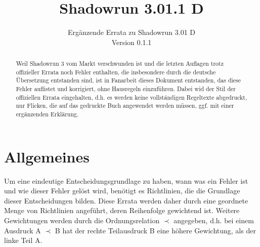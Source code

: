 \documentclass[a4paper]{scrartcl}
\title{Shadowrun 3.01.1 D}
\subtitle{Ergänzende Errata zu Shadowrun 3.01 D\\Version 0.1.1}
\author{\small\projekturl}
\begin{document}
\maketitle

\begin{abstract}
Weil Shadowrun 3 vom Markt verschwunden ist und die letzten Auflagen trotz offizieller Errata noch Fehler enthalten, die insbesondere durch die deutsche Übersetzung entstanden sind, ist in Fanarbeit dieses Dokument entstanden, das diese Fehler auflistet und korrigiert, ohne Hausregeln einzuführen. Dabei wid der Stil der offiziellen Errata eingehalten, d.h. es werden keine vollständigen Regeltexte abgedruckt, nur Flicken, die auf das gedruckte Buch angewendet werden müssen, ggf. mit einer ergänzenden Erklärung.
\end{abstract}

\tableofcontents

\section{Allgemeines}
Um eine eindeutige Entscheidungsgrundlage zu haben, wann was ein Fehler ist und wie dieser Fehler gelöst wird, benötigt es Richtlinien, die die Grundlage dieser Entscheidungen bilden.
Diese Errata werden daher durch eine geordnete Menge von Richtlinien angeführt, deren Reihenfolge gewichtend ist. Weitere Gewichtungen werden durch die Ordnungsrelation $\prec$ angegeben, d.h. bei einem Ausdruck \glqq A $\prec$ B\grqq{} hat der rechte Teilausdruck \glqq B\grqq{} eine höhere Gewichtung, als der linke Teil \glqq A\grqq.
\end{document}
